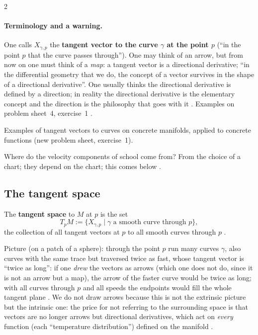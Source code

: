 \begin{paracol}{2}
\paragraph{Terminology and a warning.} One calls $X_{\gamma,p}$ the \textbf{tangent vector to the curve $\gamma$ at the point
$p$} (``in the point $p$ that the curve passes through''). One may think of an arrow, but from now on one must think of
a \emph{map}: a tangent vector is a directional derivative; ``in the differential geometry that we do, the concept of a
vector survives in the shape of a directional derivative''. One usually thinks the directional derivative is defined by a
direction; in reality the directional derivative is the elementary concept and the direction is the philosophy that goes
with it . Examples on
problem sheet~4, exercise~1 .

\begin{exercise}\label{ex:ts-sheet4}
Examples of tangent vectors to curves on concrete manifolds, applied to concrete functions (new problem sheet, exercise~1).
\end{exercise}

Where do the velocity components of school come from? From the choice of a chart; they depend on the chart; this
comes below .

\subsection{The tangent space}\label{ssec:ts-space}

\begin{definition}\label{def:ts-space}
The \textbf{tangent space} to $M$ at $p$ is the set
\[
  T_pM:=\{X_{\gamma,p}\mid \gamma\text{ a smooth curve through }p\},
\]
the collection of all tangent vectors at $p$ to all smooth curves through $p$ .
\end{definition}
Picture (on a patch of a sphere): through the point $p$ run many curves $\gamma$, also curves with the same trace but traversed
twice as fast, whose tangent vector is ``twice as long'': if one \emph{drew} the vectors as arrows (which one does not do,
since it is not an arrow but a map), the arrow of the faster curve would be twice as long; with all curves through $p$ and
all speeds the endpoints would fill the whole tangent plane .
We do not draw arrows because this is not the extrinsic picture but the intrinsic one: the price for not referring to the
surrounding space is that vectors are no longer arrows but directional derivatives, which act on
\emph{every} function (each ``temperature distribution'') defined on the manifold .


\end{paracol}
